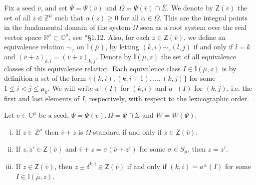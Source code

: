 \documentclass[11pt,fleqn]{amsart}
\newcommand\CC{\mathbb C}
\newcommand\RR{\mathbb R}
\newcommand\ZZ{\mathbb Z}
\newcommand\II{\mathbb I}
\newcommand\Z{\mathsf Z}
\newcommand\vv{\overline{v}}
\begin{document}
Fix a seed $\vv$, and set $\Psi = \Psi(\vv)$ and $\Omega = \Psi(\vv) \cap
\overline \Sigma$. We denote by $\Z(\vv)$ the set of all $z \in \ZZ^{\overline 
\mu}$ such that $\alpha(z) \geq 0$ for all $\alpha \in \Omega$. This are the 
integral points in the fundamental domain of the system $\Omega$ seen as a root
system over the real vector space $\RR^\mu \subset \CC^\mu$, see
\cite{Hump-coxeter-book}*{\S 1.12}. Also,  for each $z \in \Z(\vv)$, we define
an equivalence relation $\sim_z$ on $\II(\overline 
\mu)$, by letting $(k,i) \sim_z (l,j)$ if and only if $l = k$ and 
$(\vv + z)_{k,i} = (\vv + z)_{k,j}$. Denote by $\II(\overline \mu, z)$
the set of all equivalence classes of this equivalence relation. Each 
equivalence class $I \in \II(\overline
\mu, z)$ is by definition a set of the form $\{(k,i), (k,i+1), \ldots, (k,j)\}$
for some $1 \leq i < j \leq \mu_k$. We will write $a^+(I)$ for $(k,i)$ and 
$a^-(I)$ for $(k,j)$, i.e.  the first and last elements of $I$, respectively,  
with respect to the lexicographic order. 
\begin{Lemma}
\label{L:seed-varia}
Let $\vv \in \CC^\mu$ be a seed, $\Psi = \Psi(\vv), \Omega = \Psi \cap 
\overline \Sigma$ and $W = W(\Psi)$.
\begin{enumerate}[(i)]
\item
\label{i:standard}
If $z \in \ZZ^\mu$ then $\vv + z$ is $\Omega$-standard if and only if $z \in 
\Z(\vv)$.

\item
\label{i:unique}
If $z, z' \in \Z(\vv)$ and $\vv + z = \sigma(\vv + z')$ for some $\sigma \in
S_{\mu}$, then $z = z'$.

\item
\label{i:plus-minus}
If $z \in \Z(\vv)$, then $z \pm \delta^{k,i} \in \Z(\vv)$ if and only if
$(k,i) = a^\pm(I)$ for some $I \in \II(\overline \mu, z)$.
\end{enumerate}
\end{Lemma}
\end{document}
